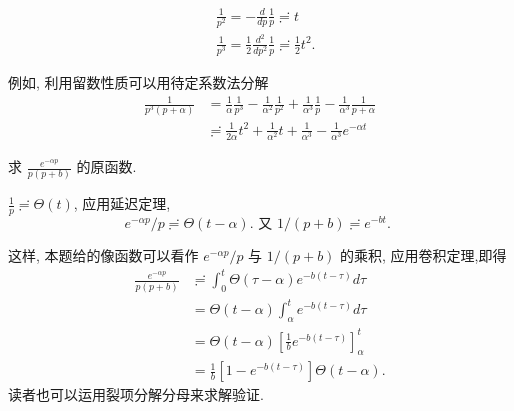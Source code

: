 $$    \begin{aligned}
    & \frac{1}{p^2}=-\frac{d}{d p} \frac{1}{p} \risingdotseq  t \\
    & \frac{1}{p^3}=\frac{1}{2} \frac{d^2}{d p^2} \frac{1}{p} \risingdotseq \frac{1}{2} t^2 .
    \end{aligned}$$


例如, 利用留数性质可以用待定系数法分解
$$
    \begin{aligned}
    \frac{1}{p^3(p+\alpha)} & =\frac{1}{\alpha} \frac{1}{p^3}-\frac{1}{\alpha^2} \frac{1}{p^2}+\frac{1}{\alpha^3} \frac{1}{p}-\frac{1}{\alpha^3} \frac{1}{p+\alpha} \\
    & \risingdotseq \frac{1}{2 \alpha} t^2+\frac{1}{\alpha^2} t+\frac{1}{\alpha^3}-\frac{1}{\alpha^3} e^{-\alpha t}
    \end{aligned}
$$

\begin{example}
求 $\frac{e^{-\alpha p}}{p(p+b)}$ 的原函数.
\end{example}
\begin{solution}
    $\frac{1}{p} \risingdotseq \Theta(t)$, 应用延迟定理,
    $$
e^{-\alpha p} / p \risingdotseq \Theta(t-\alpha) \text {. 又 } 1 /(p+b) \risingdotseq e^{-b t} \text {. }
$$

这样, 本题给的像函数可以看作 $e^{-\alpha p} / p$ 与 $1 /(p+b)$ 的乘积, 应用卷积定理,即得
$$
\begin{aligned}
\frac{e^{-\alpha p}}{p(p+b)} & \risingdotseq \int_0^t \Theta(\tau-\alpha) e^{-b(t-\tau)} d \tau \\
& =\Theta(t-\alpha) \int_\alpha^t e^{-b(t-\tau)} d \tau \\
& =\Theta(t-\alpha)\left[\frac{1}{b} e^{-b(t-\tau)}\right]_\alpha^t \\
& =\frac{1}{b}\left[1-e^{-b(t-\tau)}\right] \Theta(t-\alpha) .
\end{aligned}
$$
读者也可以运用裂项分解分母来求解验证.
\end{solution}

